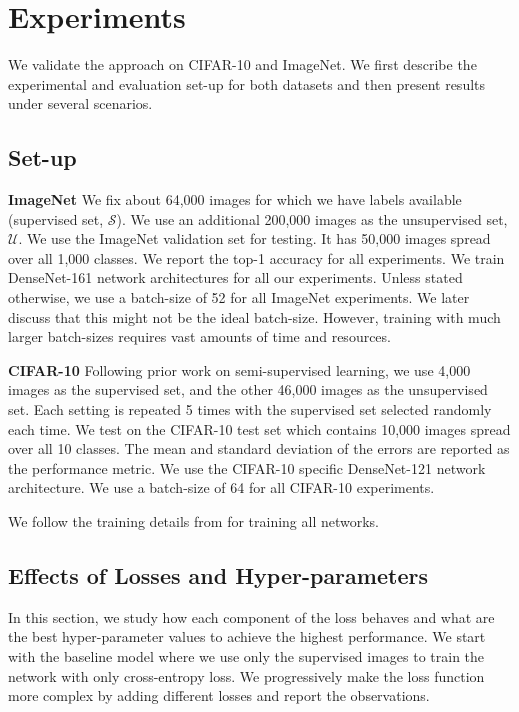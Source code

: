 \section{Experiments}

We validate the approach on CIFAR-10 and ImageNet. We first describe the experimental and evaluation
set-up for both datasets and then present results under several scenarios.

\subsection{Set-up}
\textbf{ImageNet} We fix about 64,000 images for which
we have labels available (supervised set, $\mathcal{S}$). We use an additional 200,000 images as the
unsupervised set, $\mathcal{U}$. We use the ImageNet validation set for testing. It has 50,000
images spread over all 1,000 classes. We report the top-1 accuracy for all experiments. We train
DenseNet-161 network architectures for all our experiments. Unless stated otherwise, we use a
batch-size of 52 for all ImageNet experiments. We later discuss that this might not be the ideal
batch-size. However, training with much larger batch-sizes requires vast amounts of time and
resources. 


\textbf{CIFAR-10} Following prior work on semi-supervised learning, we use 4,000
images as the supervised set, and the other 46,000 images as the unsupervised set. Each setting
is repeated 5 times with the supervised set selected randomly each time. We test on the CIFAR-10
test set which contains 10,000 images spread over all 10 classes. The mean and standard
deviation of the errors are reported as the performance metric. We use the CIFAR-10 specific
DenseNet-121 network architecture. We use a batch-size of 64 for all CIFAR-10 experiments. 

We follow the training details from \cite{densenet} for training all networks.

\subsection{Effects of Losses and Hyper-parameters}
In this section, we study how each component of the loss behaves and what are the best
hyper-parameter values to achieve the highest performance. We start with the baseline model where we
use only the supervised images to train the network with only cross-entropy loss. We progressively
make the loss function more complex by adding different losses and report the observations.  


